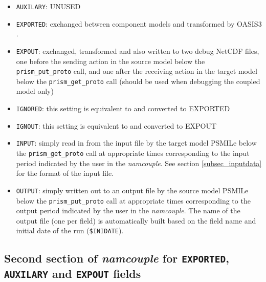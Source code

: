 \begin{itemize}
\item {\tt AUXILARY}: UNUSED
\item {\tt EXPORTED}: exchanged between component models and
  transformed by OASIS3 .
\item {\tt EXPOUT}: exchanged, transformed and also written to two
  debug NetCDF files, one before the sending action in the source model
  below the {\tt prism\_put\_proto} call, and one after the receiving
  action in the target model below the {\tt prism\_get\_proto} call (should
  be used when debugging the coupled model only)
\item {\tt IGNORED}: this setting is equivalent to and converted to EXPORTED
\item {\tt IGNOUT}: this setting is equivalent to and converted to EXPOUT
\item {\tt INPUT}: simply read in from the input file by the target
  model PSMILe below the {\tt prism\_get\_proto} call at appropriate
  times corresponding to the input period indicated by the user in the
  {\it namcouple}. See section
  \ref{subsec_inputdata} for the format of the input file.
\item {\tt OUTPUT}: simply written out to an output file by the source
  model PSMILe below the {\tt prism\_put\_proto} call at appropriate
  times corresponding to the output period indicated by the user in
  the {\it namcouple}. The name of the output file (one per field) is
  automatically built based on the field name and initial date of the
  run ({\tt \$INIDATE}).

\end{itemize}

\subsection{Second section of {\it namcouple} for {\tt EXPORTED}, {\tt
      AUXILARY} and {\tt EXPOUT} fields}
\label{subsubsec_secondEXPORTED}

